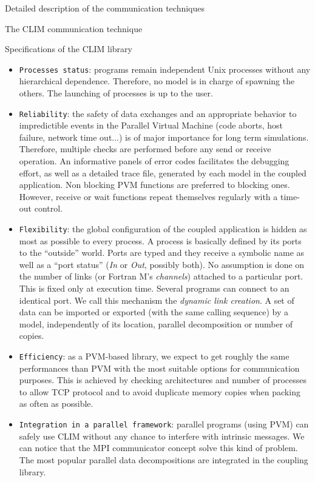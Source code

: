 \begin{section}{Detailed description of the communication techniques}
\begin{subsection}{The CLIM communication technique}
\begin{subsubsection}{Specifications of the CLIM library}
\begin{itemize}
\item {\tt Processes status}: programs remain independent Unix
processes without any hierarchical dependence. Therefore, no model
is in charge of spawning the others. The launching of processes is up to
the user. 

\item {\tt Reliability}: the safety of data exchanges and an
appropriate behavior to impredictible events in the Parallel Virtual
Machine (code aborts, host failure, network time out...) is of major
importance for long term simulations. 
Therefore, multiple checks are performed before any send or
receive operation. An informative panels of error codes facilitates the
debugging effort, as well as a detailed trace file, generated by each
model in the coupled application.
Non blocking PVM functions are preferred to blocking ones. 
However, receive or wait functions repeat themselves regularly with
a time-out control.

\item {\tt Flexibility}: the global configuration of the coupled
application is hidden as most as possible to every process.
A process is basically defined by its ports to the ``outside'' world.
Ports are typed and they receive a symbolic name as well as a ``port
status'' ({\it In} or {\it Out}, possibly both). 
No assumption is done on the number of
links (or Fortran M's {\it channels}) attached to a particular port.
This is fixed only at execution time. Several programs can
connect to an identical port. We call this mechanism the {\it dynamic 
link creation}.
A set of data can be imported or exported (with the same calling
sequence) by a model, independently of its
location, parallel decomposition or number of copies.

\item {\tt Efficiency}: as a PVM-based library, we expect to get
roughly the same performances than PVM with the most suitable options
for communication purposes. This is achieved by checking architectures
and number of processes to allow TCP protocol and to avoid duplicate
memory copies when packing as often as possible.

\item {\tt Integration in a parallel framework}:
parallel programs (using PVM) 
can safely use CLIM without any chance to interfere with 
intrinsic messages.
We can notice that the MPI communicator concept
solve this kind of problem. The most popular parallel data 
decompositions are integrated in the coupling library.


\end{itemize}
\end{subsubsection}
\end{subsection}
\end{section}
